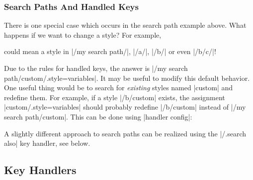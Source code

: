 \subsubsection{Search Paths And Handled Keys}

There is one special case which occurs in the search path example above. What
happens if we want to change a style? For example,
%
\begin{codeexample}
\end{codeexample}
%
\noindent could mean a style in |/my search path/|, |/a/|, |/b/| or even
|/b/c/|!

Due to the rules for handled keys, the answer is
|/my search path/custom/.style={variables}|. It may be useful to modify this
default behavior. One useful thing would be to search for \emph{existing}
styles named |custom| and redefine them. For example, if a style |/b/custom|
exists, the assignment |custom/.style={variables}| should probably redefine
|/b/custom| instead of |/my search path/custom|. This can be done using
|handler config|:
%
\begin{codeexample}[]





\end{codeexample}

A slightly different approach to search paths can be realized using the
|/.search also| key handler, see below.


\subsection{Key Handlers}

